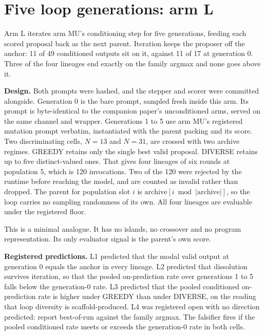 \section{Five loop generations: arm L}\label{sec:arm-l}

Arm L iterates arm MU's conditioning step for five generations, feeding each scored proposal
back as the next parent. Iteration keeps the proposer off the anchor: 11 of 49 conditioned outputs sit on it,
against 11 of 17 at generation 0. Three of the four lineages end exactly on the family argmax
and none goes above it.

\textbf{Design.} Both prompts were hashed, and the stepper and scorer were committed
alongside. Generation 0 is the bare prompt, sampled
fresh inside this arm. Its prompt is byte-identical to the companion paper's unconditioned
arms, served on the same channel and wrapper. Generations 1 to 5 use arm MU's
registered mutation prompt verbatim, instantiated with the parent packing and its score. Two
discriminating cells, $N = 13$ and $N = 31$, are crossed with two archive regimes. GREEDY
retains only the single best valid proposal. DIVERSE retains up to five distinct-valued ones.
That gives four lineages of six rounds at population 5, which is 120 invocations. Two of the
120 were rejected by the runtime before reaching the model, and are counted as invalid rather
than dropped. The parent for population slot $i$ is
$\text{archive}[i \bmod |\text{archive}|]$, so the loop carries no sampling randomness of its
own. All four lineages are evaluable under the registered floor.

This is a minimal analogue. It has no islands, no crossover and no program representation.
Its only evaluator signal is the parent's own score.

\textbf{Registered predictions.} L1 predicted that the modal valid output at generation 0
equals the anchor in every lineage. L2 predicted that dissolution survives
iteration, so that the pooled on-prediction rate over generations 1 to 5 falls below the
generation-0 rate. L3 predicted that the pooled conditioned on-prediction rate is higher under
GREEDY than under DIVERSE, on the reading that loop diversity is scaffold-produced. L4 was
registered open with no direction predicted: report best-of-run against the family argmax.
The falsifier fires if the pooled conditioned rate meets or exceeds the generation-0 rate in
both cells.


